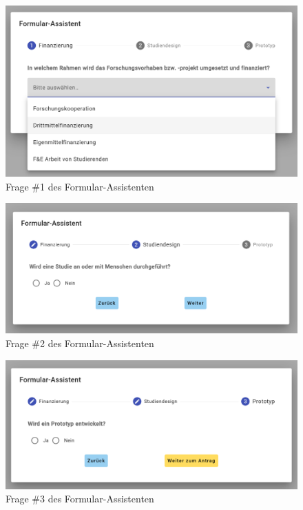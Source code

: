 \documentclass[a4paper,12pt,twoside,numbers=noendperiod]{scrreprt}
\begin{document}
\begin{figure}[htp!]
    \centering
    \includegraphics[width=.85\linewidth]{thesis/images/Luidold_EthicsVision-Formular-Assistent_Finanzierung.png}
    \caption{Frage \#1 des Formular-Assistenten}
    \label{fig:ethics-vision-formular-assistent-finanzierung}
\end{figure}

\begin{figure}[htp!]
    \centering
    \includegraphics[width=.85\linewidth]{thesis/images/Luidold_EthicsVision-Formular-Assistent_Studiendesign.png}
    \caption{Frage \#2 des Formular-Assistenten}
    \label{fig:ethics-vision-formular-assistent-studiendesign}
\end{figure}

\begin{figure}[htp!]
    \centering
    \includegraphics[width=.85\linewidth]{thesis/images/Luidold_EthicsVision-Formular-Assistent_Prototyp.png}
    \caption{Frage \#3 des Formular-Assistenten}
    \label{fig:ethics-vision-formular-assistent-prototyp}
\end{figure}
\end{document}
